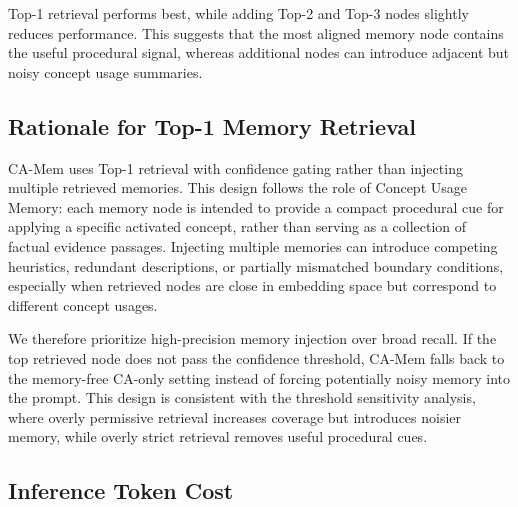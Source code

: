 \documentclass[11pt]{article}
\begin{document}
Top-1 retrieval performs best, while adding Top-2 and Top-3 nodes slightly reduces performance. This suggests that the most aligned memory node contains the useful procedural signal, whereas additional nodes can introduce adjacent but noisy concept usage summaries.

\subsection{Rationale for Top-1 Memory Retrieval}
\label{sec:app_top1_rationale}

CA-Mem uses Top-1 retrieval with confidence gating rather than injecting multiple retrieved memories. This design follows the role of Concept Usage Memory: each memory node is intended to provide a compact procedural cue for applying a specific activated concept, rather than serving as a collection of factual evidence passages. Injecting multiple memories can introduce competing heuristics, redundant descriptions, or partially mismatched boundary conditions, especially when retrieved nodes are close in embedding space but correspond to different concept usages.

We therefore prioritize high-precision memory injection over broad recall. If the top retrieved node does not pass the confidence threshold, CA-Mem falls back to the memory-free CA-only setting instead of forcing potentially noisy memory into the prompt. This design is consistent with the threshold sensitivity analysis, where overly permissive retrieval increases coverage but introduces noisier memory, while overly strict retrieval removes useful procedural cues.

\subsection{Inference Token Cost}
\label{sec:app_inference_cost}
\end{document}
